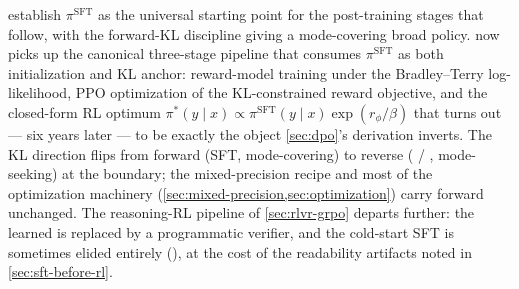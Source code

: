 establish $\pi^{\mathrm{SFT}}$ as the universal starting point for the
post-training stages that follow, with the forward-KL discipline
giving a mode-covering broad policy.  now picks up the
canonical three-stage  pipeline that consumes $\pi^{\mathrm{SFT}}$
as both initialization and KL anchor: reward-model training under the
Bradley--Terry log-likelihood, PPO optimization of the KL-constrained
reward objective, and the closed-form RL optimum
$\pi^*(y \mid x) \propto \pi^{\mathrm{SFT}}(y \mid x) \exp(r_\phi /
\beta)$ that turns out — six years later — to be exactly the object
\cref{sec:dpo}'s  derivation inverts. The KL direction flips from
forward (SFT, mode-covering) to reverse ( / , mode-seeking) at
the boundary; the mixed-precision recipe and most of the optimization
machinery (\cref{sec:mixed-precision,sec:optimization}) carry forward
unchanged. The reasoning-RL pipeline of \cref{sec:rlvr-grpo} departs
further: the learned  is replaced by a programmatic
verifier, and the cold-start SFT is sometimes elided entirely
(), at the cost of the readability artifacts noted in
\cref{sec:sft-before-rl}.
